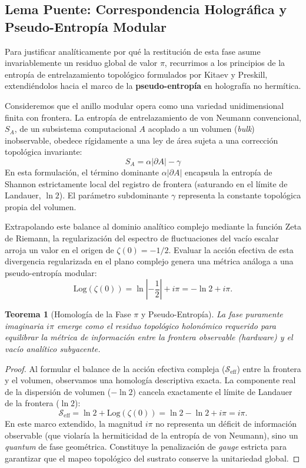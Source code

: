 \documentclass[12pt,a4paper]{article}
\theoremstyle{plain}
\newtheorem{teorema}{Teorema}[section]
\theoremstyle{definition}
\theoremstyle{remark}
\begin{document}
\subsection{Lema Puente: Correspondencia Holográfica y Pseudo-Entropía Modular}
\label{subsec:lema_puente}

Para justificar analíticamente por qué la restitución de esta fase asume invariablemente un residuo global de valor $\pi$, recurrimos a los principios de la entropía de entrelazamiento topológico formulados por Kitaev y Preskill, extendiéndolos hacia el marco de la \textbf{pseudo-entropía} en holografía no hermítica.

Consideremos que el anillo modular opera como una variedad unidimensional finita con frontera. La entropía de entrelazamiento de von Neumann convencional, $S_A$, de un subsistema computacional $A$ acoplado a un volumen (\textit{bulk}) inobservable, obedece rígidamente a una ley de área sujeta a una corrección topológica invariante:
\begin{equation}
    S_A = \alpha |\partial A| - \gamma
\end{equation}
En esta formulación, el término dominante $\alpha |\partial A|$ encapsula la entropía de Shannon estrictamente local del registro de frontera (saturando en el límite de Landauer, $\ln 2$). El parámetro subdominante $\gamma$ representa la constante topológica propia del volumen.

Extrapolando este balance al dominio analítico complejo mediante la función Zeta de Riemann, la regularización del espectro de fluctuaciones del vacío escalar arroja un valor en el origen de $\zeta(0) = -1/2$. Evaluar la acción efectiva de esta divergencia regularizada en el plano complejo genera una métrica análoga a una pseudo-entropía modular:
\begin{equation}
    \text{Log}(\zeta(0)) = \ln\left|-\frac{1}{2}\right| + i\pi = -\ln 2 + i\pi.
\end{equation}

\begin{teorema}[Homología de la Fase $\pi$ y Pseudo-Entropía]
La fase puramente imaginaria $i\pi$ emerge como el residuo topológico holonómico requerido para equilibrar la métrica de información entre la frontera observable (hardware) y el vacío analítico subyacente.
\end{teorema}
\begin{proof}
Al formular el balance de la acción efectiva compleja ($\mathcal{S}_{\text{eff}}$) entre la frontera y el volumen, observamos una homología descriptiva exacta. La componente real de la dispersión de volumen ($-\ln 2$) cancela exactamente el límite de Landauer de la frontera ($\ln 2$):
\begin{equation}
    \mathcal{S}_{\text{eff}} = \ln 2 + \text{Log}(\zeta(0)) = \ln 2 - \ln 2 + i\pi = i\pi.
\end{equation}
En este marco extendido, la magnitud $i\pi$ no representa un déficit de información observable (que violaría la hermiticidad de la entropía de von Neumann), sino un \textit{quantum} de fase geométrica. Constituye la penalización de \textit{gauge} estricta para garantizar que el mapeo topológico del sustrato conserve la unitariedad global.
\end{proof}
\end{document}
